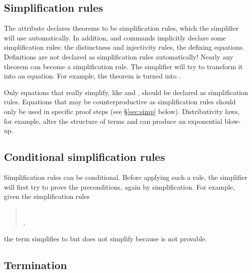 \begin{isabellebody}
\begin{isamarkuptext}
\subsection{Simplification rules}

The attribute  declares theorems to be simplification rules,
which the simplifier will use automatically. In addition,
 and  commands implicitly declare some
simplification rules:  the distinctness and injectivity
rules,  the defining equations. Definitions are not declared
as simplification rules automatically! Nearly any theorem can become a
simplification rule. The simplifier will try to transform it into an
equation. For example, the theorem  is turned into .

Only equations that really simplify, like  and
, should be declared as simplification
rules. Equations that may be counterproductive as simplification rules
should only be used in specific proof steps (see \S\ref{sec:simp} below).
Distributivity laws, for example, alter the structure of terms
and can produce an exponential blow-up.

\subsection{Conditional simplification rules}

Simplification rules can be conditional.  Before applying such a rule, the
simplifier will first try to prove the preconditions, again by
simplification. For example, given the simplification rules
\begin{quote}
\\
,
\end{quote}
the term  simplifies to 
but  does not simplify because 
is not provable.

\subsection{Termination}


\end{isamarkuptext}
\end{isabellebody}
